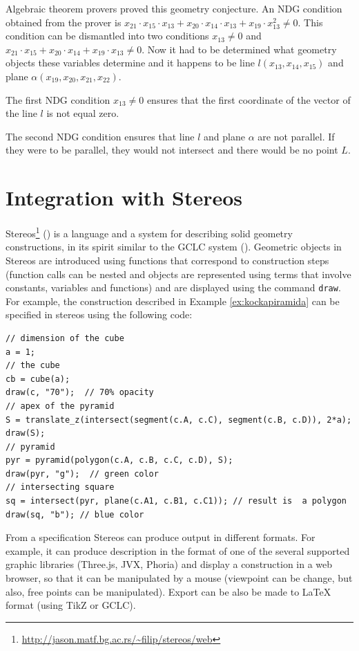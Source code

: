 \documentclass[final,1p,times,authoryear]{elsarticle}
\begin{document}
Algebraic theorem provers proved this geometry conjecture. An NDG
condition obtained from the prover is
$x_{21} \cdot x_{15} \cdot x_{13} + x_{20} \cdot x_{14} \cdot x_{13} +
x_{19} \cdot x_{13}^2 \neq 0$.
This condition can be dismantled into two conditions $x_{13} \neq 0$
and
$x_{21} \cdot x_{15} + x_{20} \cdot x_{14} + x_{19} \cdot x_{13} \neq
0$.
Now it had to be determined what geometry objects these variables
determine and it happens to be line $l(x_{13}, x_{14}, x_{15})$ and
plane $\alpha(x_{19}, x_{20}, x_{21}, x_{22})$.

The first NDG condition $x_{13} \neq 0$ ensures that the first
coordinate of the vector of the line $l$ is not equal zero. 

The second NDG condition ensures that line $l$ and plane $\alpha$
are not parallel. If they were to be parallel, they would not
intersect and there would be no point $L$. 

\section{Integration with Stereos}

Stereos\footnote{\url{http://jason.matf.bg.ac.rs/~filip/stereos/web}}
(\cite{stereos}) is a language and a system for describing solid
geometry constructions, in its spirit similar to the GCLC system
(\cite{gclc}). Geometric objects in Stereos are introduced using
functions that correspond to construction steps (function calls can be
nested and objects are represented using terms that involve constants,
variables and functions) and are displayed using the command
\verb|draw|. For example, the construction described in Example
\ref{ex:kockapiramida} can be specified in stereos using the following
code:

\begin{verbatim}
// dimension of the cube
a = 1;
// the cube
cb = cube(a);
draw(c, "70");  // 70% opacity
// apex of the pyramid
S = translate_z(intersect(segment(c.A, c.C), segment(c.B, c.D)), 2*a);
draw(S);
// pyramid
pyr = pyramid(polygon(c.A, c.B, c.C, c.D), S);
draw(pyr, "g");  // green color
// intersecting square
sq = intersect(pyr, plane(c.A1, c.B1, c.C1)); // result is  a polygon
draw(sq, "b"); // blue color
\end{verbatim}

From a specification Stereos can produce output in different
formats. For example, it can produce description in the format of one
of the several supported graphic libraries (Three.js, JVX, Phoria) and
display a construction in a web browser, so that it can be manipulated
by a mouse (viewpoint can be change, but also, free points can be
manipulated). Export can be also be made to LaTeX format (using TikZ
or GCLC).
\end{document}
